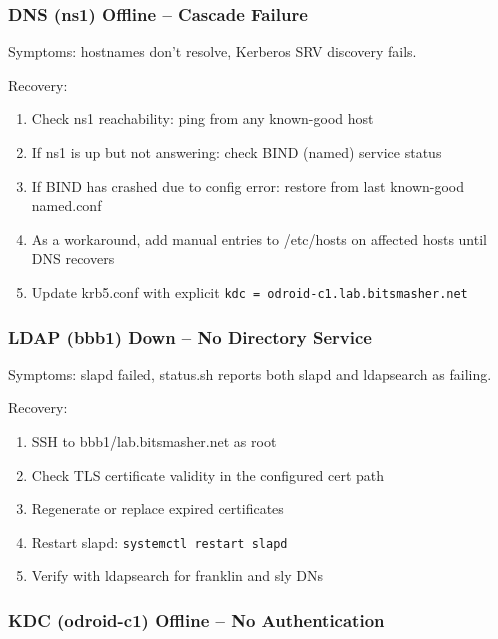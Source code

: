 \subsubsection{DNS (ns1) Offline -- Cascade Failure}

Symptoms: hostnames don't resolve, Kerberos SRV discovery fails.

Recovery:
\begin{enumerate}
    \item Check ns1 reachability: ping from any known-good host
    
    \item If ns1 is up but not answering: check BIND (named) service status
    
    \item If BIND has crashed due to config error: restore from last known-good named.conf
    
    \item As a workaround, add manual entries to /etc/hosts on affected hosts until DNS recovers
    
    \item Update krb5.conf with explicit \texttt{kdc = odroid-c1.lab.bitsmasher.net}
\end{enumerate}

\subsubsection{LDAP (bbb1) Down -- No Directory Service}

Symptoms: slapd failed, status.sh reports both slapd and ldapsearch as failing.

Recovery:
\begin{enumerate}
    \item SSH to bbb1/lab.bitsmasher.net as root
    
    \item Check TLS certificate validity in the configured cert path
    
    \item Regenerate or replace expired certificates
    
    \item Restart slapd: \texttt{systemctl restart slapd}
    
    \item Verify with ldapsearch for franklin and sly DNs
\end{enumerate}

\subsubsection{KDC (odroid-c1) Offline -- No Authentication}

